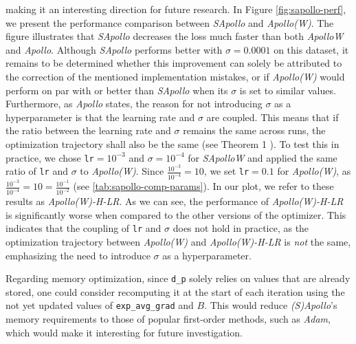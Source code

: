     making it an interesting direction for future research.
    In Figure \ref{fig:sapollo-perf}, we present the performance comparison between \emph{SApollo} and  \emph{Apollo(W)}.
    The figure illustrates that \emph{SApollo} decreases the loss much faster than both \emph{ApolloW} and \emph{Apollo}.
    Although \emph{SApollo} performs better with $\sigma = 0.0001$ on this dataset, it remains to be determined whether this improvement can solely
    be attributed to the correction of the mentioned implementation mistakes,
    or if \emph{Apollo(W)} would perform on par with or better than \emph{SApollo} when its $\sigma$ is set to similar values.
    Furthermore, as \emph{Apollo} \cite{apollo} states, the reason for not introducing $\sigma$ as a hyperparameter is that the learning rate and $\sigma$ are coupled.
    This means that if the ratio between the learning rate and $\sigma$ remains the same across runs, the optimization trajectory shall also be the same (see Theorem 1 \cite{apollo}). 
    To test this in practice,
    we chose \texttt{lr}$=10^{-3}$ and $\sigma=10^{-4}$ for \emph{SApolloW} and applied the same ratio of \texttt{lr} and $\sigma$ to \emph{Apollo(W)}. Since $\frac{10^{-3}}{10^{-4}}=10$, we set \texttt{lr}$=0.1$ for \emph{Apollo(W)},
    as $\frac{10^{-3}}{10^{-4}}=10=\frac{10^{-1}}{10^{-2}}$ (see \ref{tab:sapollo-comp-params}). In our plot, we refer to these results as \emph{Apollo(W)-H-LR}.
    As we can see, the performance of \emph{Apollo(W)-H-LR} is significantly worse when compared to the other versions of the optimizer. 
    This indicates that the coupling of \texttt{lr} and $\sigma$ does not hold in practice, as the optimization trajectory between \emph{Apollo(W)} and \emph{Apollo(W)-H-LR} is \emph{not} the same,
    emphasizing the need to introduce $\sigma$ as a hyperparameter.

    Regarding memory optimization, since \texttt{d\_p} solely relies on values that are already stored, one could consider recomputing it at the start of each iteration
    using the not yet updated values of \texttt{exp\_avg\_grad} and $B$.
    This would reduce \emph{(S)Apollo}'s memory requirements to those of popular first-order methods, such as \emph{Adam}, which would 
    make it interesting for future investigation.


